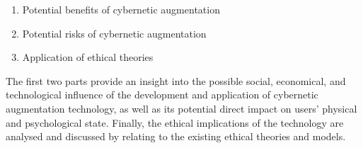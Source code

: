 \begin{enumerate}
	\item Potential benefits of cybernetic augmentation
	\item Potential risks of cybernetic augmentation
	\item Application of ethical theories 
\end{enumerate}

The first two parts provide an insight into the possible social, economical, and technological influence of the development and application of cybernetic augmentation technology, as well as its potential direct impact on users' physical and psychological state. Finally, the ethical implications of the technology are analysed and discussed by relating to the existing ethical theories and models.



